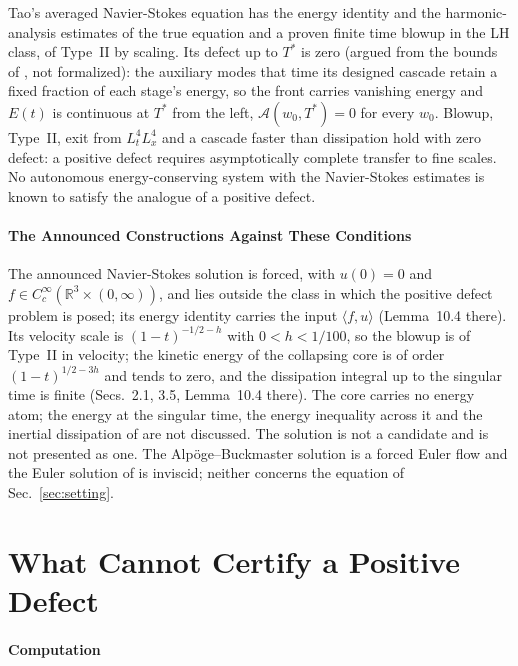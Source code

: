 \documentclass[letterpaper,twocolumn]{article}
\newcommand{\A}{\mathcal{A}}
\begin{document}
Tao's averaged Navier-Stokes equation \cite{Tao16} has the energy identity
and the harmonic-analysis estimates of the true equation and a proven
finite time blowup in the LH class, of Type~II by scaling. Its defect up
to $T^*$ is zero (argued from the bounds of \cite{Tao16}, not
formalized): the auxiliary modes that time its designed cascade retain a
fixed fraction of each stage's energy, so the front carries vanishing
energy and $E(t)$ is continuous at $T^*$ from the left, $\A(w_0,T^*) = 0$
for every $w_0$. Blowup, Type~II, exit from $L^4_tL^4_x$ and a cascade
faster than dissipation hold with zero defect: a positive defect requires
asymptotically complete transfer to fine scales. No autonomous
energy-conserving system with the Navier-Stokes estimates is known to
satisfy the analogue of a positive defect.

\paragraph*{The Announced Constructions Against These Conditions}

The announced Navier-Stokes solution \cite{OpenAI26NS} is forced, with
$u(0) = 0$ and $f \in C_c^\infty(\mathbb{R}^3 \times (0,\infty))$, and
lies outside the class in which the positive defect problem is posed; its
energy identity carries the input $\langle f, u\rangle$ (Lemma~10.4
there). Its velocity scale is $(1-t)^{-1/2-h}$ with $0 < h < 1/100$, so
the blowup is of Type~II in velocity; the kinetic energy of the
collapsing core is of order $(1-t)^{1/2-3h}$ and tends to zero, and the
dissipation integral up to the singular time is finite (Secs.~2.1, 3.5,
Lemma~10.4 there). The core carries no energy atom; the energy at the
singular time, the energy inequality across it and the inertial
dissipation of \cite{DucRob00} are not discussed. The solution is not a
candidate and is not presented as one. The Alp\"oge--Buckmaster solution
is a forced Euler flow and the Euler solution of \cite{OpenAI26Euler} is
inviscid; neither concerns the equation of Sec.~\ref{sec:setting}.

\section{What Cannot Certify a Positive Defect}
\label{sec:cannot}

\paragraph*{Computation}
\end{document}

